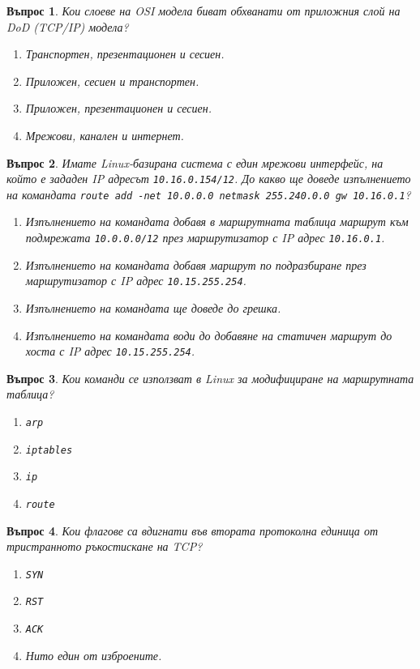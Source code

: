 \documentclass[11pt]{scrartcl}
\newtheorem{q}{Въпрос}
\newenvironment{defractors}{
\begin{enumerate}
  \setlength{\itemsep}{1pt}
  \setlength{\parskip}{0pt}
  \setlength{\parsep}{0pt}
}{\end{enumerate}}
\begin{document}
\begin{q}
  Кои слоеве на OSI модела биват обхванати от приложния слой на DoD (TCP/IP) модела?

  \begin{defractors}
    \item Транспортен, презентационен и сесиен.
    \item Приложен, сесиен и транспортен.
    \item Приложен, презентационен и сесиен.
    \item Мрежови, канален и интернет.
  \end{defractors}
\end{q}

\begin{q}
  Имате Linux-базирана система с един мрежови интерфейс, на който е зададен IP
  адресът \texttt{10.16.0.154/12}. До какво ще доведе изпълнението на командата
  \texttt{route add -net 10.0.0.0 netmask 255.240.0.0 gw 10.16.0.1}?

  \begin{defractors}
  \item Изпълнението на командата добавя в маршрутната таблица маршрут към
    подмрежата \texttt{10.0.0.0/12} през маршрутизатор с IP адрес
    \texttt{10.16.0.1}.
    \item Изпълнението на командата добавя маршрут по подразбиране през
      маршрутизатор с IP адрес \texttt{10.15.255.254}.
    \item Изпълнението на командата ще доведе до грешка.
    \item Изпълнението на командата води до добавяне на статичен маршрут до
      хоста с IP адрес \texttt{10.15.255.254}.
 \end{defractors}
\end{q}

\begin{q}
  Кои команди се използват в Linux за модифициране на маршрутната таблица?

  \begin{defractors}
    \item \texttt{arp}
    \item \texttt{iptables}
    \item \texttt{ip}
    \item \texttt{route}
  \end{defractors}
\end{q}

\begin{q}
  Кои флагове са вдигнати във втората протоколна единица от тристранното
  ръкостискане на TCP?

  \begin{defractors}
    \item \texttt{SYN}
    \item \texttt{RST}
    \item \texttt{ACK}
    \item Нито един от изброените.
  \end{defractors}
\end{q}
\end{document}
